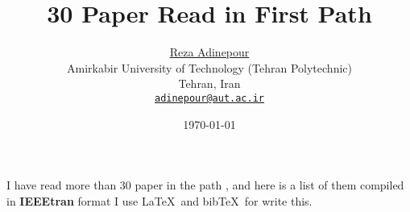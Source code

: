 \documentclass[a4paper,10pt]{article}
\title{\textbf{30 Paper Read in First Path}}
\author{\href{https://github.com/rezaAdinepour}{Reza Adinepour}\\
Amirkabir University of Technology (Tehran Polytechnic) \\
Tehran, Iran \\
\texttt{\href{mailto:adinepour@aut.ac.ir}{adinepour@aut.ac.ir}}
}
\date{\today}
\begin{document}
	\maketitle
	
	
	I have read more than 30 paper in the  path , and here is a list of them compiled in \textbf{IEEEtran} format I use \LaTeX \ and bib\TeX \ for write this.
	
	
	

	
	
\end{document}
